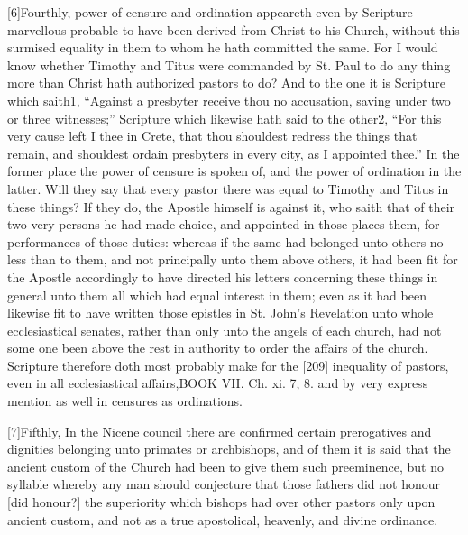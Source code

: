 [6]Fourthly, power of censure and ordination appeareth even by Scripture marvellous probable to have been derived from Christ to his Church, without this surmised equality in them to whom he hath committed the same. For I would know whether Timothy and Titus were commanded by St. Paul to do any thing more than Christ hath authorized pastors to do? And to the one it is Scripture which saith1, “Against a presbyter receive thou no accusation, saving under two or three witnesses;” Scripture which likewise hath said to the other2, “For this very cause left I thee in Crete, that thou shouldest redress the things that remain, and shouldest ordain presbyters in every city, as I appointed thee.” In the former place the power of censure is spoken of, and the power of ordination in the latter. Will they say that every pastor there was equal to Timothy and Titus in these things? If they do, the Apostle himself is against it, who saith that of their two very persons he had made choice, and appointed in those places them, for performances of those duties: whereas if the same had belonged unto others no less than to them, and not principally unto them above others, it had been fit for the Apostle accordingly to have directed his letters concerning these things in general unto them all which had equal interest in them; even as it had been likewise fit to have written those epistles in St. John’s Revelation unto whole ecclesiastical senates, rather than only unto the angels of each church, had not some one been above the rest in authority to order the affairs of the church. Scripture therefore doth most probably make for the [209] inequality of pastors, even in all ecclesiastical affairs,BOOK VII. Ch. xi. 7, 8. and by very express mention as well in censures as ordinations.

[7]Fifthly, In the Nicene council there are confirmed certain prerogatives and dignities belonging unto primates or archbishops, and of them it is said that the ancient custom of the Church had been to give them such preeminence, but no syllable whereby any man should conjecture that those fathers did not honour [did honour?] the superiority which bishops had over other pastors only upon ancient custom, and not as a true apostolical, heavenly, and divine ordinance.

